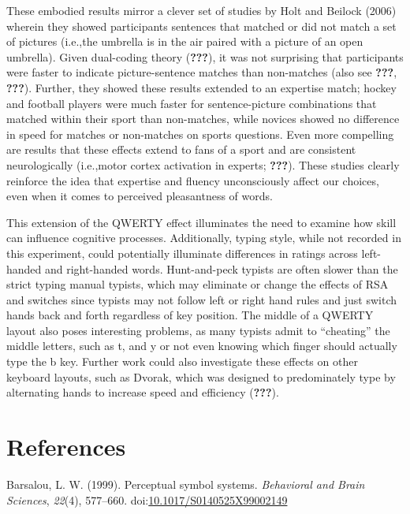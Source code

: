 \documentclass[english,man]{apa6}
\theoremstyle{definition}
\theoremstyle{definition}
\theoremstyle{definition}
\theoremstyle{remark}
\begin{document}
These embodied results mirror a clever set of studies by Holt and
Beilock (2006) wherein they showed participants sentences that matched
or did not match a set of pictures (i.e.,the umbrella is in the air
paired with a picture of an open umbrella). Given dual-coding theory
({\textbf{???}}), it was not surprising that participants were faster to
indicate picture-sentence matches than non-matches (also see
{\textbf{???}}, {\textbf{???}}). Further, they showed these results
extended to an expertise match; hockey and football players were much
faster for sentence-picture combinations that matched within their sport
than non-matches, while novices showed no difference in speed for
matches or non-matches on sports questions. Even more compelling are
results that these effects extend to fans of a sport and are consistent
neurologically (i.e.,motor cortex activation in experts;
{\textbf{???}}). These studies clearly reinforce the idea that expertise
and fluency unconsciously affect our choices, even when it comes to
perceived pleasantness of words.

This extension of the QWERTY effect illuminates the need to examine how
skill can influence cognitive processes. Additionally, typing style,
while not recorded in this experiment, could potentially illuminate
differences in ratings across left-handed and right-handed words.
Hunt-and-peck typists are often slower than the strict typing manual
typists, which may eliminate or change the effects of RSA and switches
since typists may not follow left or right hand rules and just switch
hands back and forth regardless of key position. The middle of a QWERTY
layout also poses interesting problems, as many typists admit to
\enquote{cheating} the middle letters, such as t, and y or not even
knowing which finger should actually type the b key. Further work could
also investigate these effects on other keyboard layouts, such as
Dvorak, which was designed to predominately type by alternating hands to
increase speed and efficiency ({\textbf{???}}).

\newpage

\section{References}\label{references}

\setlength{\parindent}{-0.5in} \setlength{\leftskip}{0.5in}

\hypertarget{refs}{}
\hypertarget{ref-Barsalou1999}{}
Barsalou, L. W. (1999). Perceptual symbol systems. \emph{Behavioral and
Brain Sciences}, \emph{22}(4), 577--660.
doi:\href{https://doi.org/10.1017/S0140525X99002149}{10.1017/S0140525X99002149}
\end{document}
